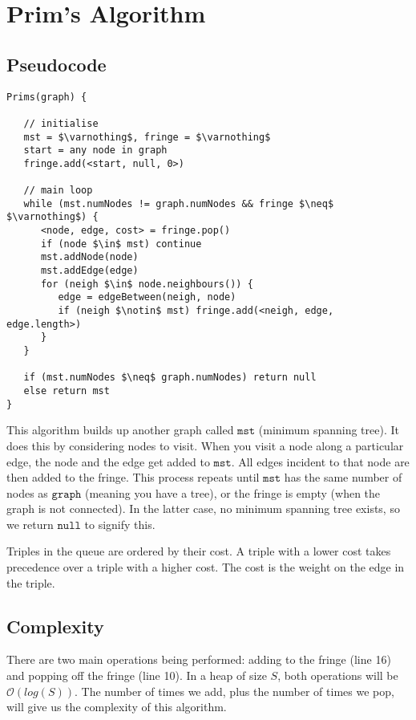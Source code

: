 \documentclass[a4paper,12pt]{article}
\newcommand{\kwa}[1]{\mathtt{#1}}
\begin{document}
\section{Prim's Algorithm}

\subsection{Pseudocode}
\begin{lstlisting}
Prims(graph) {

   // initialise
   mst = $\varnothing$, fringe = $\varnothing$
   start = any node in graph
   fringe.add(<start, null, 0>)
   
   // main loop
   while (mst.numNodes != graph.numNodes && fringe $\neq$ $\varnothing$) {
      <node, edge, cost> = fringe.pop()
      if (node $\in$ mst) continue
      mst.addNode(node)
      mst.addEdge(edge)
      for (neigh $\in$ node.neighbours()) {
         edge = edgeBetween(neigh, node)
         if (neigh $\notin$ mst) fringe.add(<neigh, edge, edge.length>)
      }
   }
   
   if (mst.numNodes $\neq$ graph.numNodes) return null
   else return mst
}
\end{lstlisting}

\noindent
This algorithm builds up another graph called $\kwa{mst}$ (minimum spanning tree). It does this by considering nodes to visit. When you visit a node along a particular edge, the node and the edge get added to $\kwa{mst}$. All edges incident to that node are then added to the fringe. This process repeats until $\kwa{mst}$ has the same number of nodes as $\kwa{graph}$ (meaning you have a tree), or the fringe is empty (when the graph is not connected). In the latter case, no minimum spanning tree exists, so we return $\kwa{null}$ to signify this.

Triples in the queue are ordered by their cost. A triple with a lower cost takes precedence over a triple with a higher cost. The cost is the weight on the edge in the triple.

\subsection{Complexity}

There are two main operations being performed: adding to the fringe (line 16) and popping off the fringe (line 10). In a heap of size $S$, both operations will be $\mathcal{O}(log(S))$. The number of times we add, plus the number of times we pop, will give us the complexity of this algorithm.
\end{document}

